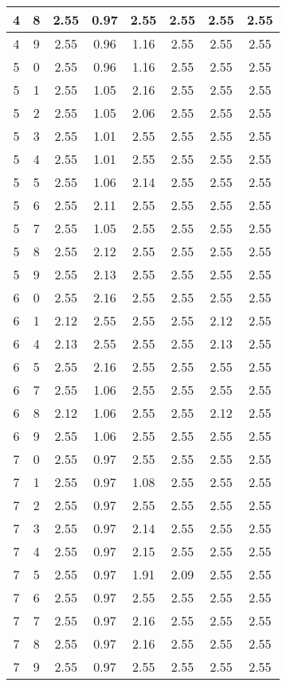 \begin{longtable}{|c|c||c||c|c|c||c|c|}
	4 & 8 & 2.55 & 0.97 & 2.55 & 2.55 & 2.55 & 2.55 \\ \hline
	4 & 9 & 2.55 & 0.96 & 1.16 & 2.55 & 2.55 & 2.55 \\ \hline
	5 & 0 & 2.55 & 0.96 & 1.16 & 2.55 & 2.55 & 2.55 \\ \hline
	5 & 1 & 2.55 & 1.05 & 2.16 & 2.55 & 2.55 & 2.55 \\ \hline
	5 & 2 & 2.55 & 1.05 & 2.06 & 2.55 & 2.55 & 2.55 \\ \hline
	5 & 3 & 2.55 & 1.01 & 2.55 & 2.55 & 2.55 & 2.55 \\ \hline
	5 & 4 & 2.55 & 1.01 & 2.55 & 2.55 & 2.55 & 2.55 \\ \hline
	5 & 5 & 2.55 & 1.06 & 2.14 & 2.55 & 2.55 & 2.55 \\ \hline
	5 & 6 & 2.55 & 2.11 & 2.55 & 2.55 & 2.55 & 2.55 \\ \hline
	5 & 7 & 2.55 & 1.05 & 2.55 & 2.55 & 2.55 & 2.55 \\ \hline
	5 & 8 & 2.55 & 2.12 & 2.55 & 2.55 & 2.55 & 2.55 \\ \hline
	5 & 9 & 2.55 & 2.13 & 2.55 & 2.55 & 2.55 & 2.55 \\ \hline
	6 & 0 & 2.55 & 2.16 & 2.55 & 2.55 & 2.55 & 2.55 \\ \hline
	6 & 1 & 2.12 & 2.55 & 2.55 & 2.55 & 2.12 & 2.55 \\ \hline
	6 & 4 & 2.13 & 2.55 & 2.55 & 2.55 & 2.13 & 2.55 \\ \hline
	6 & 5 & 2.55 & 2.16 & 2.55 & 2.55 & 2.55 & 2.55 \\ \hline
	6 & 7 & 2.55 & 1.06 & 2.55 & 2.55 & 2.55 & 2.55 \\ \hline
	6 & 8 & 2.12 & 1.06 & 2.55 & 2.55 & 2.12 & 2.55 \\ \hline
	6 & 9 & 2.55 & 1.06 & 2.55 & 2.55 & 2.55 & 2.55 \\ \hline
	7 & 0 & 2.55 & 0.97 & 2.55 & 2.55 & 2.55 & 2.55 \\ \hline
	7 & 1 & 2.55 & 0.97 & 1.08 & 2.55 & 2.55 & 2.55 \\ \hline
	7 & 2 & 2.55 & 0.97 & 2.55 & 2.55 & 2.55 & 2.55 \\ \hline
	7 & 3 & 2.55 & 0.97 & 2.14 & 2.55 & 2.55 & 2.55 \\ \hline
	7 & 4 & 2.55 & 0.97 & 2.15 & 2.55 & 2.55 & 2.55 \\ \hline
	7 & 5 & 2.55 & 0.97 & 1.91 & 2.09 & 2.55 & 2.55 \\ \hline
	7 & 6 & 2.55 & 0.97 & 2.55 & 2.55 & 2.55 & 2.55 \\ \hline
	7 & 7 & 2.55 & 0.97 & 2.16 & 2.55 & 2.55 & 2.55 \\ \hline
	7 & 8 & 2.55 & 0.97 & 2.16 & 2.55 & 2.55 & 2.55 \\ \hline
	7 & 9 & 2.55 & 0.97 & 2.55 & 2.55 & 2.55 & 2.55 \\ \hline
\end{longtable}
